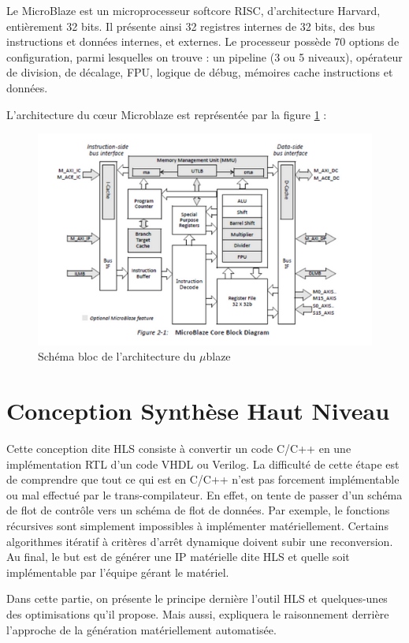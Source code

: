 \documentclass[12pt,a4paper]{article}
\begin{document}
Le MicroBlaze est un microprocesseur softcore RISC, d'architecture Harvard, entièrement 32 bits. Il présente ainsi 32 registres internes de 32 bits, des bus instructions et données internes, et externes.
Le processeur possède 70 options de configuration, parmi lesquelles on trouve : un pipeline (3 ou 5 niveaux), opérateur de division, de décalage, FPU, logique de débug, mémoires cache instructions et données.

L’architecture du cœur Microblaze est représentée par la figure \ref{fig:screenshot004} :
\begin{figure}[H]
	\centering
	\includegraphics[trim= 0  20 0 0,clip,width=0.8\linewidth]{soft/screenshot004}
	\caption{Schéma bloc de l'architecture du $\mu$blaze}
	\label{fig:screenshot004}
\end{figure}


\section{Conception Synthèse Haut Niveau}
Cette conception dite HLS consiste à convertir un code C/C++ en une implémentation RTL d'un code VHDL ou Verilog. La difficulté de cette étape est de comprendre que tout ce qui est en C/C++ n'est pas forcement implémentable ou mal effectué par le trans-compilateur. En effet, on tente de passer d'un schéma de flot de contrôle vers un schéma de flot de données. Par exemple, le fonctions récursives sont simplement impossibles à implémenter matériellement. Certains algorithmes itératif à critères d'arrêt dynamique doivent subir une reconversion. Au final, le but est de générer une IP matérielle dite HLS et quelle soit implémentable par l'équipe gérant le matériel.

Dans cette partie, on présente le principe dernière l'outil HLS et quelques-unes des optimisations qu'il propose. Mais aussi, expliquera le raisonnement derrière l'approche de la génération matériellement automatisée.
\end{document}
